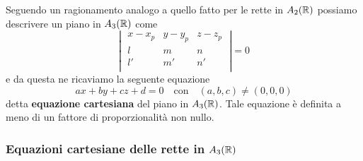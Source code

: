 \documentclass[twoside]{report}
\begin{document}
Seguendo un ragionamento analogo a quello fatto per le rette in \(A_2(\RR )\) possiamo descrivere un piano in \(A_3(\RR )\) come \[
\left| \; \begin{matrix}
    x-x_p & y-y_p & z-z_p \\
    l & m & n \\
    l' & m' & n' \\
\end{matrix} \; \right| = 0
\] e da questa ne ricaviamo la seguente equazione \[
ax + by + cz + d = 0 \quad \text{con} \quad  (a,b,c) \neq (0,0,0)
\] detta \textbf{equazione cartesiana} del piano in \(A_3(\RR )\). Tale equazione è definita a meno di un fattore di proporzionalità non nullo.

\subsubsection{Equazioni cartesiane delle rette in \(A_3(\RR )\)}
\end{document}
